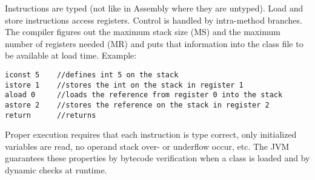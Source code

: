 \begin{center}
\end{center}
\begin{mytitle} Instructions are typed (not like in Assembly where they are untyped). Load and store instructions access registers. Control is handled by intra-method branches. The compiler figures out the maximum stack size (MS) and the maximum number of registers needed (MR) and puts that information into the class file to be available at load time. Example:
\begin{lstlisting}
iconst 5    //defines int 5 on the stack
istore 1    //stores the int on the stack in register 1
aload 0     //loads the reference from register 0 into the stack
astore 2    //stores the reference on the stack in register 2
return      //returns
\end{lstlisting}
\end{mytitle}
\begin{mytitle} Proper execution requires that each instruction is type correct, only initialized variables are read, no operand stack over- or underflow occur, etc. The JVM guarantees these properties by bytecode verification when a class is loaded and by dynamic checks at runtime.
\end{mytitle}
